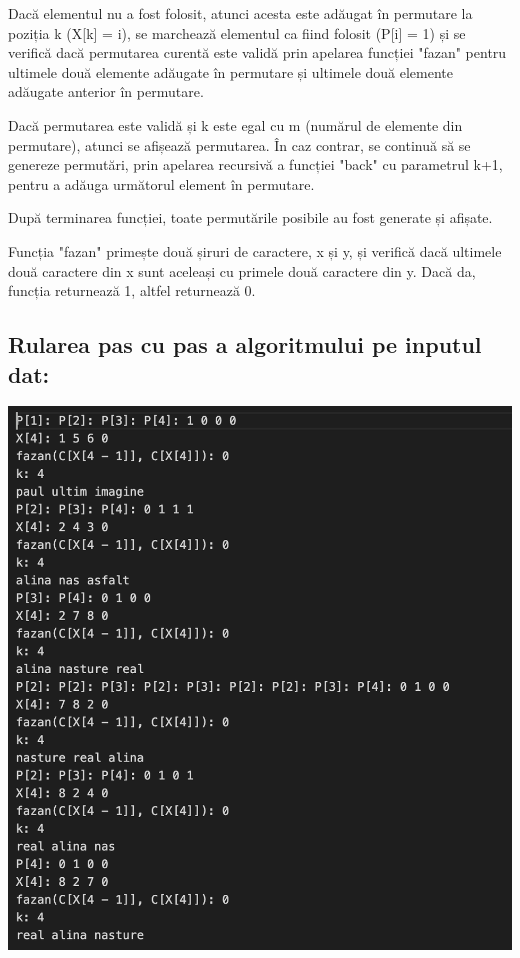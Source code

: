 \documentclass[runningheads]{llncs}
\begin{document}
Dacă elementul nu a fost folosit, atunci acesta este adăugat în permutare la poziția k (X[k] = i), se marchează elementul ca fiind folosit (P[i] = 1) și se verifică dacă permutarea curentă este validă prin apelarea funcției "fazan" pentru ultimele două elemente adăugate în permutare și ultimele două elemente adăugate anterior în permutare. \neline

Dacă permutarea este validă și k este egal cu m (numărul de elemente din permutare), atunci se afișează permutarea. În caz contrar, se continuă să se genereze permutări, prin apelarea recursivă a funcției "back" cu parametrul k+1, pentru a adăuga următorul element în permutare.\newline

După terminarea funcției, toate permutările posibile au fost generate și afișate.\newline

Funcția "fazan" primește două șiruri de caractere, x și y, și verifică dacă ultimele două caractere din x sunt aceleași cu primele două caractere din y. Dacă da, funcția returnează 1, altfel returnează 0.
\subsection{Rularea pas cu pas a algoritmului pe inputul dat:}
\begin{center}
    \includegraphics[scale=0.5]{p4.png}
\end{center}
\end{document}
